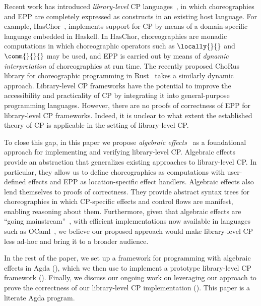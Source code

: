 Recent work has introduced \emph{library-level} CP languages~\citep{shen-2023, kashiwa-2023}, in which choreographies and EPP are completely expressed as constructs in an existing host language.  For example, HasChor~\citep{shen-2023}, implements support for CP by means of a domain-specific language embedded in Haskell.
In HasChor, choreographies are monadic computations in which choreographic operators such as $\locally{}{}$ and $\comm{}{}{}$ may be used, and EPP is carried out by means of \emph{dynamic interpretation} of choreographies at run time.  The recently proposed ChoRus library for choreographic programming in Rust~\citep{kashiwa-2023} takes a similarly dynamic approach.
%
Library-level CP frameworks have the potential to improve the accessibility and practicality of CP by integrating it into general-purpose programming languages.
%
However, there are no proofs of correctness of EPP for library-level CP frameworks. Indeed, it is unclear to what extent the established theory of CP is applicable in the setting of library-level CP.

To close this gap, in this paper we propose \emph{algebraic effects}~\citep{plotkin-2003, plotkin-2013} as a foundational approach for implementing and verifying library-level CP.
%
Algebraic effects provide an abstraction that generalizes existing approaches to library-level CP.
%
In particular, they allow us to define choreographies as computations with user-defined effects and EPP as location-specific effect handlers.
%
Algebraic effects also lend themselves to proofs of correctness.
%
They provide abstract syntax trees for choreographies in which CP-specific effects and control flows are manifest, enabling reasoning about them.
%
Furthermore, given that algebraic effects are ``going mainstream''~\citep{dagstuhl-alg-effects-report}, with efficient implementations now available in languages such as OCaml~\citep{sivaramakrishnan-ocaml-effect-handlers}, we believe our proposed approach would make library-level CP less ad-hoc and bring it to a broader audience.


%
In the rest of the paper, we set up a framework for programming with algebraic effects in Agda (), which we then use to implement a prototype library-level CP framework ().  Finally, we discuss our ongoing work on leveraging our approach to prove the correctness of our library-level CP implementation ().  This paper is a literate Agda program.



